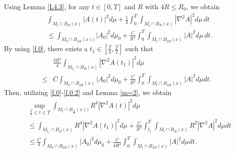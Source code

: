 \documentclass{amsart}
\theoremstyle{definition}
\numberwithin{equation}{section}
\begin{document}
Using Lemma \ref{L4.3}, for any $t\in [0, T]$ and $R$ with $4R\leq R_0$, we obtain
  \begin{align} \label{f.0}
  &\int_{ M_t\cap B_R(x)} \left| A(t)\right|^{2} d\mu + \frac{1}{2} \int_{0}^{T} \int_{ M_t\cap B_R(x)}  \left| \nabla^{2}A \right|^{2}   d\mu
  \, dt \\
 & \leq \int_{ M_0\cap B_{2R}(x))} \left| A_{0} \right|^{2} d\mu_{0} + \frac C {R^4} \int_0^T \int_{ M_t\cap B_{2R}(x)} \left| A\right|^{2}
 d\mu \,dt  \mbox{.}\nonumber
   \end{align}
By using \eqref{f.0},  there exists a $t_1\in [\frac T 4, \frac T 2]$  such that
\begin{align} \label{f.0.2}
  &  \frac {\delta R^4} 4  \int_{ M_{t_1}\cap B_R(x)} \left| \nabla^{2}
  A (t_1) \right|^{2} d\mu    \\
 \leq  &C \int_{  M_0\cap B_{2R}(x)} \left| A_0 \right|^{2} d\mu_{0} +  \frac C {R^4} \int_0^T \int_{M_t\cap
 B_{2R}(x)} \left| A \right|^{2} d\mu dt\nonumber
 \mbox{.}
   \end{align}
Then, utilizing   \eqref{f.0}-\eqref{f.0.2} and Lemma \ref{m=2}, we obtain
\begin{align}\label{f4}
   &  \sup_{\frac T 2\leq t\leq T}\int_{  M_t\cap B_{\frac R 2}(x)) } R^4 \left| \nabla^{2} A(t)  \right|^{2}  d\mu\\
    & \leq  \int_{  M_{t_1}\cap B_{R}(x)} R^4 \left| \nabla^{2} A(t_1) \right|^{2}  d\mu
  +      \frac C {R^4}\int_{t_1}^T \int_{  M_t\cap B_{R}(x)}  R^2 \left| \nabla^{2} A  \right|^{2}  d\mu dt\nonumber \\
 & \leq \frac C{\delta}\int_{  M_0\cap B_{2R}(x)}  {\left| A_{0} \right|^{2}} d\mu_{0} + \frac C {\delta R^4} \int_0^T \int_{  M_t\cap
 B_{2R}(x)}
 {\left| A\right|^{2}}
 d\mu d t \nonumber
  \mbox{.}
\end{align}
\end{document}
